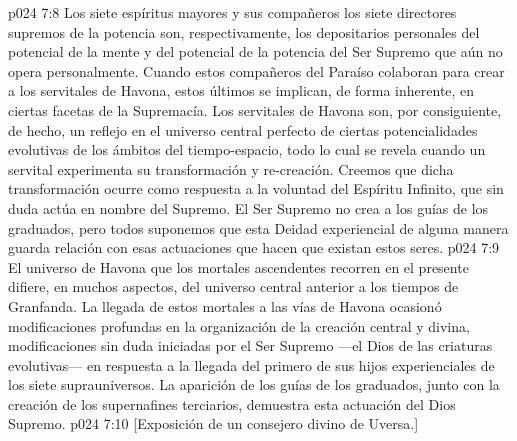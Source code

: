 \vs p024 7:8 \pc Los siete espíritus mayores y sus compañeros los siete directores supremos de la potencia son, respectivamente, los depositarios personales del potencial de la mente y del potencial de la potencia del Ser Supremo que aún no opera personalmente. Cuando estos compañeros del Paraíso colaboran para crear a los servitales de Havona, estos últimos se implican, de forma inherente, en ciertas facetas de la Supremacía. Los servitales de Havona son, por consiguiente, de hecho, un reflejo en el universo central perfecto de ciertas potencialidades evolutivas de los ámbitos del tiempo\hyp{}espacio, todo lo cual se revela cuando un servital experimenta su transformación y re\hyp{}creación. Creemos que dicha transformación ocurre como respuesta a la voluntad del Espíritu Infinito, que sin duda actúa en nombre del Supremo. El Ser Supremo no crea a los guías de los graduados, pero todos suponemos que esta Deidad experiencial de alguna manera guarda relación con esas actuaciones que hacen que existan estos seres.
\vs p024 7:9 El universo de Havona que los mortales ascendentes recorren en el presente difiere, en muchos aspectos, del universo central anterior a los tiempos de Granfanda. La llegada de estos mortales a las vías de Havona ocasionó modificaciones profundas en la organización de la creación central y divina, modificaciones sin duda iniciadas por el Ser Supremo ---el Dios de las criaturas evolutivas--- en respuesta a la llegada del primero de sus hijos experienciales de los siete suprauniversos. La aparición de los guías de los graduados, junto con la creación de los supernafines terciarios, demuestra esta actuación del Dios Supremo.
\vsetoff
\vs p024 7:10 [Exposición de un consejero divino de Uversa.]
